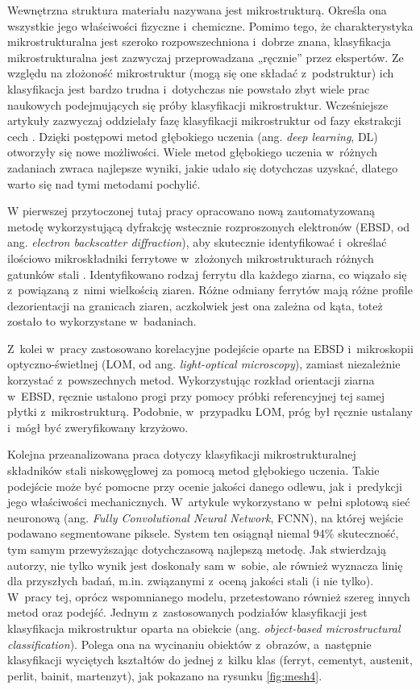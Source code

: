 Wewnętrzna struktura materiału nazywana jest mikrostrukturą. Określa ona wszystkie jego właściwości fizyczne i~chemiczne. Pomimo tego, że charakterystyka mikrostrukturalna jest szeroko rozpowszechniona i~dobrze znana, klasyfikacja mikrostrukturalna jest zazwyczaj przeprowadzana „ręcznie” przez ekspertów. Ze względu na złożoność mikrostruktur (mogą się one składać z~podstruktur) ich klasyfikacja jest bardzo trudna i~dotychczas nie powstało zbyt wiele prac naukowych podejmujących się próby klasyfikacji mikrostruktur. Wcześniejsze artykuły zazwyczaj oddzielały fazę klasyfikacji mikrostruktur od fazy ekstrakcji cech \cite{Azimi18}. Dzięki postępowi metod głębokiego uczenia (ang. \textit{deep learning}, DL) otworzyły się nowe możliwości. Wiele metod głębokiego uczenia w~różnych zadaniach zwraca najlepsze wyniki, jakie udało się dotychczas uzyskać, dlatego warto się nad tymi metodami pochylić. 

W pierwszej przytoczonej tutaj pracy opracowano nową zautomatyzowaną metodę wykorzystującą dyfrakcję wstecznie rozproszonych elektronów (EBSD, od ang. \textit{electron backscatter diffraction}), aby skutecznie identyfikować i~określać ilościowo mikroskładniki ferrytowe w~złożonych mikrostrukturach różnych gatunków stali \cite{Shrestha13}. Identyfikowano rodzaj ferrytu dla każdego ziarna, co wiązało się z~powiązaną z~nimi wielkością ziaren. Różne odmiany ferrytów mają różne profile dezorientacji na granicach ziaren, aczkolwiek jest ona zależna od kąta, toteż zostało to wykorzystane w~badaniach.

Z~kolei w~pracy \cite{Britz17} zastosowano korelacyjne podejście oparte na EBSD i~mikroskopii optyczno-świetlnej (LOM, od ang. \textit{light-optical microscopy}), zamiast niezależnie korzystać z~powszechnych metod. Wykorzystując rozkład orientacji ziarna w~EBSD, ręcznie ustalono progi przy pomocy próbki referencyjnej tej samej płytki z~mikrostrukturą. Podobnie, w~przypadku LOM, próg był ręcznie ustalany i~mógł być zweryfikowany krzyżowo.

Kolejna przeanalizowana praca \cite{Azimi18} dotyczy klasyfikacji mikrostrukturalnej składników stali niskowęglowej za pomocą metod głębokiego uczenia. Takie podejście może być pomocne przy ocenie jakości danego odlewu, jak i~predykcji jego właściwości mechanicznych. W~artykule wykorzystano w~pełni splotową sieć neuronową (ang. \textit{Fully Convolutional Neural Network}, FCNN), na której wejście podawano segmentowane piksele. System ten osiągnął niemal 94\% skuteczność, tym samym przewyższając dotychczasową najlepszą metodę. Jak stwierdzają autorzy, nie tylko wynik jest doskonały sam w~sobie, ale również wyznacza linię dla przyszłych badań, m.in. związanymi z~oceną jakości stali (i nie tylko). W~pracy tej, oprócz wspomnianego modelu, przetestowano również szereg innych metod oraz podejść. Jednym z~zastosowanych podziałów klasyfikacji jest klasyfikacja mikrostruktur oparta na obiekcie (ang. \textit{object-based microstructural classification}). Polega ona na wycinaniu obiektów z~obrazów, a~następnie klasyfikacji wyciętych kształtów do jednej z~kilku klas (ferryt, cementyt, austenit, perlit, bainit, martenzyt), jak pokazano na rysunku \ref{fig:mesh4}.  

